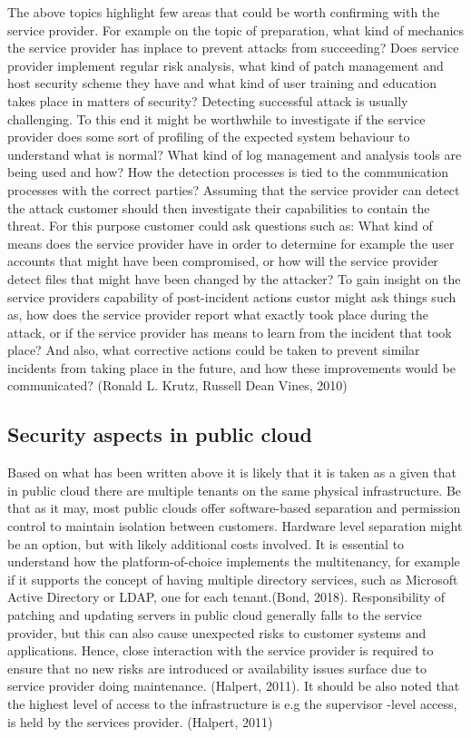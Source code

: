 \documentclass{article}
\begin{document}
The above topics highlight few areas that could be worth confirming with the service provider. For example on the topic of preparation, what kind of mechanics the service provider has inplace to prevent attacks from succeeding? Does service provider implement regular risk analysis, what kind of patch management and host security scheme they have and what kind of user training and education takes place in matters of security? Detecting successful attack is usually challenging. To this end it might be worthwhile to investigate if the service provider does some sort of profiling of the expected system behaviour to understand what is normal? What kind of log management and analysis tools are being used and how? How the detection processes is tied to the communication processes with the correct parties? Assuming that the service provider can detect the attack customer should then investigate their capabilities to contain the threat. For this purpose customer could ask questions such as: What kind of means does the service provider have in order to determine for example the user accounts that might have been compromised, or how will the service provider detect files that might have been changed by the attacker? To gain insight on the service providers capability of post-incident actions custor might ask things such as, how does the service provider report what exactly took place during the attack, or if the service provider has means to learn from the incident that took place? And also, what corrective actions could be taken to prevent similar incidents from taking place in the future, and how these improvements would be communicated? (Ronald L. Krutz, Russell Dean Vines, 2010)
\subsection{Security aspects in public cloud}
Based on what has been written above it is likely that it is taken as a given that in public cloud there are multiple tenants on the same physical infrastructure.
Be that as it may, most public clouds offer software-based separation and permission control to maintain isolation between customers. Hardware level separation might be an option, but with likely additional costs involved. It is essential to understand how the platform-of-choice implements the multitenancy, for example if it supports the concept of having multiple directory services, such as Microsoft Active Directory or LDAP, one for each tenant.(Bond, 2018).
Responsibility of patching and updating servers in public cloud generally falls to the service provider, but this can also cause unexpected risks to customer systems and applications. Hence, close interaction with the service provider is required to ensure that no new risks are introduced  or availability issues surface due to service provider doing maintenance. (Halpert, 2011).
It should be also noted that the highest level of access to the infrastructure is e.g the supervisor -level access, is held by the services provider. (Halpert, 2011)
\end{document}
